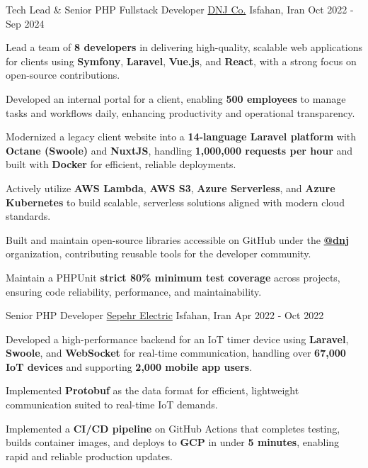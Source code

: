 
\begin{cventries}

  \cventry
    {Tech Lead \& Senior PHP Fullstack Developer} %
    {\href{https://dnj.co.ir}{DNJ Co.}} %
    {Isfahan, Iran} %
    {Oct 2022 - Sep 2024} %
    {
      \begin{cvitems}
        \item {Lead a team of \textbf{8 developers} in delivering high-quality, scalable web applications for clients using \textbf{Symfony}, \textbf{Laravel}, \textbf{Vue.js}, and \textbf{React}, with a strong focus on open-source contributions.}
        \item {Developed an internal portal for a client, enabling \textbf{500 employees} to manage tasks and workflows daily, enhancing productivity and operational transparency.}
        \item {Modernized a legacy client website into a \textbf{14-language Laravel platform} with \textbf{Octane (Swoole)} and \textbf{NuxtJS}, handling \textbf{1,000,000 requests per hour} and built with \textbf{Docker} for efficient, reliable deployments.}
        \item {Actively utilize \textbf{AWS Lambda}, \textbf{AWS S3}, \textbf{Azure Serverless}, and \textbf{Azure Kubernetes} to build scalable, serverless solutions aligned with modern cloud standards.}
        \item {Built and maintain open-source libraries accessible on GitHub under the \textbf{\href{https://github.com/dnj}{\faGithubSquare\acvHeaderIconSep @dnj}} organization, contributing reusable tools for the developer community.}
        \item {Maintain a PHPUnit \textbf{strict 80\% minimum test coverage} across projects, ensuring code reliability, performance, and maintainability.}
      \end{cvitems}
    }

  \cventry
    {Senior PHP Developer} %
    {\href{https://www.hinics.com/}{Sepehr Electric}} %
    {Isfahan, Iran} %
    {Apr 2022 - Oct 2022} %
    {
      \begin{cvitems}
        \item {Developed a high-performance backend for an IoT timer device using \textbf{Laravel}, \textbf{Swoole}, and \textbf{WebSocket} for real-time communication, handling over \textbf{67,000 IoT devices} and supporting \textbf{2,000 mobile app users}.}
        \item {Implemented \textbf{Protobuf} as the data format for efficient, lightweight communication suited to real-time IoT demands.}
        \item {Implemented a \textbf{CI/CD pipeline} on GitHub Actions that completes testing, builds container images, and deploys to \textbf{GCP} in under \textbf{5 minutes}, enabling rapid and reliable production updates.}
      \end{cvitems}
    }


\end{cventries}
